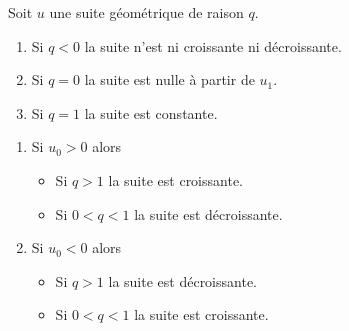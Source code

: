 \documentclass[a4paper,11pt,cours]{nsi} %
\begin{document}
\begin{propriete}
	Soit $u$ une suite géométrique de raison $q$.
	\begin{enumerate}[label=\textbullet]
		\item 	Si $q<0$ la suite n'est ni croissante ni décroissante.
		\item 	Si $q=0$ la suite est nulle à partir de $u_1$.
		\item 	Si $q=1$ la suite est constante.
	\end{enumerate}
	\begin{multicols}{2}
		\begin{enumerate}[label=\textbullet]
			\item 	Si $u_0>0$ alors 	\begin{itemize}
				\item 	Si $q>1$ la suite est croissante.
				\item 	Si $0<q<1$ la suite est décroissante.
			\end{itemize}
			\item 	Si $u_0<0$ alors 	\begin{itemize}
				\item 	Si $q>1$ la suite est décroissante.
				\item 	Si $0<q<1$ la suite est croissante.
			\end{itemize}		
		\end{enumerate}
	\end{multicols}
\end{propriete}	

\begin{demonstration}
\end{demonstration}	
\end{document}
